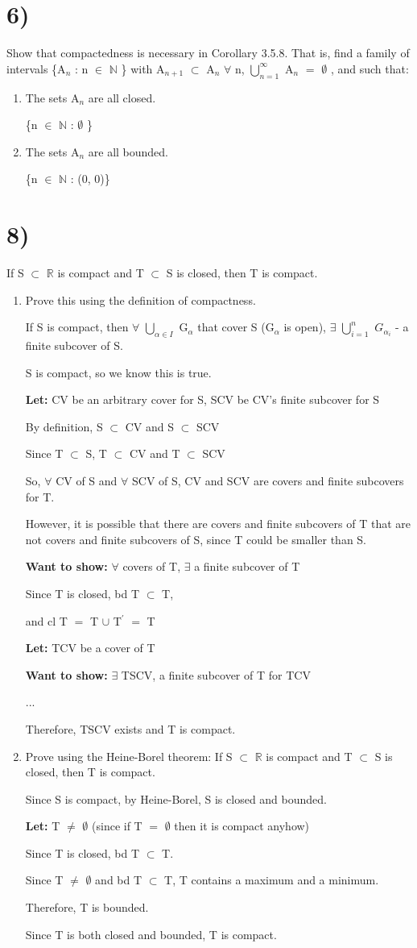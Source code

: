 \documentclass{article}
\newcommand{\mt}[1]{\ensuremath{#1}}
\newcommand\bsc[2][\DefaultOpt]{%
  \def\DefaultOpt{#2}%
  \section[#1]{#2}%
}
\newcommand{\balist}{\begin{enumerate}[label=\alph*.]}
\newcommand{\elist}{\end{enumerate}}
\newcommand{\lt}[1]{\textbf{Let: } #1}
\newcommand{\wts}[1]{\textbf{Want to show: } #1}
\newcommand{\dbs}[3]{\mt{#1_{#2_#3}}}
\newcommand{\br}{\mt{\mathbb{R}} }       %
\newcommand{\bn}{\mt{\mathbb{N}} }       %
\newcommand{\fa}{\mt{\forall} }          %
\newcommand{\afa}{\mt{\alpha} }
\newcommand{\mem}{\mt{\in} }
\newcommand{\exs}{\mt{\exists} }
\newcommand{\es}{\mt{\emptyset} }        %
\newcommand{\sbs}{\mt{\subset} }         %
\newcommand{\eql}{\mt{=} }
\newcommand{\pr}{\mt{^\prime} } 		   %
\newcommand{\uw}[2]{#1\mt{_{#2}}}
\newcommand{\urng}[2]{\mt{\bigcup_{#1}^{#2}}}
\begin{document}
\bsc{6)}{
Show that compactedness is necessary in Corollary 3.5.8. That is, find a family of intervals \{\uw{A}{n} : n \mem \bn\} with \uw{A}{n + 1} \sbs \uw{A}{n} \fa n, \urng{n = 1}{\infty} \uw{A}{n} \eql \es, and such that:

\balist
\item The sets \uw{A}{n} are all closed. 
	
	\{n \mem \bn : \es\}
\item The sets \uw{A}{n} are all bounded.
	
	\{n \mem \bn : (0, 0)\}
\elist

}

\bsc{8)}{
If S \sbs \br is compact and T \sbs S is closed, then T is compact.

\balist
\item Prove this using the definition of compactness.
	
	If S is compact, then \fa \urng{\afa \mem I}{} \uw{G}{\afa} that cover S (\uw{G}{\afa} is open), \exs \urng{i = 1}{n} \dbs{G}{\afa}{i} - a finite subcover of S.
	
	S is compact, so we know this is true.
	
	\lt{CV be an arbitrary cover for S, SCV be CV's finite subcover for S}
	
	By definition, S \sbs CV and S \sbs SCV
	
	Since T \sbs S, T \sbs CV and T \sbs SCV
	
	So, \fa CV of S and \fa SCV of S, CV and SCV are covers and finite subcovers for T.
	
	However, it is possible that there are covers and finite subcovers of T that are not covers and finite subcovers of S, since T could be smaller than S.
	
	\wts{\fa covers of T, \exs a finite subcover of T}
	
	Since T is closed, bd T \sbs T, 
	
	and cl T \eql T $\cup$ T\pr \eql T
	
	\lt{TCV be a cover of T}
	
	\wts{\exs TSCV, a finite subcover of T for TCV}

	...
	
	Therefore, TSCV exists and T is compact.
	
	
	
	
\item Prove using the Heine-Borel theorem: If S \sbs \br is compact and T \sbs S is closed, then T is compact.

	Since S is compact, by Heine-Borel, S is closed and bounded.
	
	\lt{T $\neq$ \es} (since if T \eql \es then it is compact anyhow)
	
	Since T is closed, bd T \sbs T.
	
	Since T $\neq$ \es and bd T \sbs T, T contains a maximum and a minimum.
	
	Therefore, T is bounded.
	
	Since T is both closed and bounded, T is compact.
	
	
\elist

}
\end{document}
